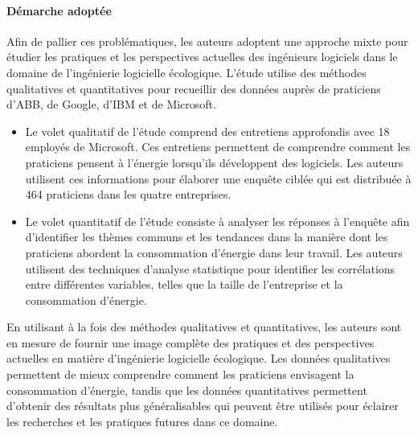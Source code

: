 \paragraph{Démarche adoptée}
Afin de pallier ces problématiques, les auteurs adoptent une approche mixte pour étudier les pratiques et les perspectives actuelles des ingénieurs logiciels dans le domaine de l'ingénierie logicielle écologique. L'étude utilise des méthodes qualitatives et quantitatives pour recueillir des données auprès de praticiens d'ABB, de Google, d'IBM et de Microsoft.
\begin{itemize}
    \item Le volet qualitatif de l'étude comprend des entretiens approfondis avec 18 employés de Microsoft. Ces entretiens permettent de comprendre comment les praticiens pensent à l'énergie lorsqu'ils développent des logiciels. Les auteurs utilisent ces informations pour élaborer une enquête ciblée qui est distribuée à 464 praticiens dans les quatre entreprises.
    \item Le volet quantitatif de l'étude consiste à analyser les réponses à l'enquête afin d'identifier les thèmes communs et les tendances dans la manière dont les praticiens abordent la consommation d'énergie dans leur travail. Les auteurs utilisent des techniques d'analyse statistique pour identifier les corrélations entre différentes variables, telles que la taille de l'entreprise et la consommation d'énergie.
\end{itemize}
En utilisant à la fois des méthodes qualitatives et quantitatives, les auteurs sont en mesure de fournir une image complète des pratiques et des perspectives actuelles en matière d'ingénierie logicielle écologique. Les données qualitatives permettent de mieux comprendre comment les praticiens envisagent la consommation d'énergie, tandis que les données quantitatives permettent d'obtenir des résultats plus généralisables qui peuvent être utilisés pour éclairer les recherches et les pratiques futures dans ce domaine.

